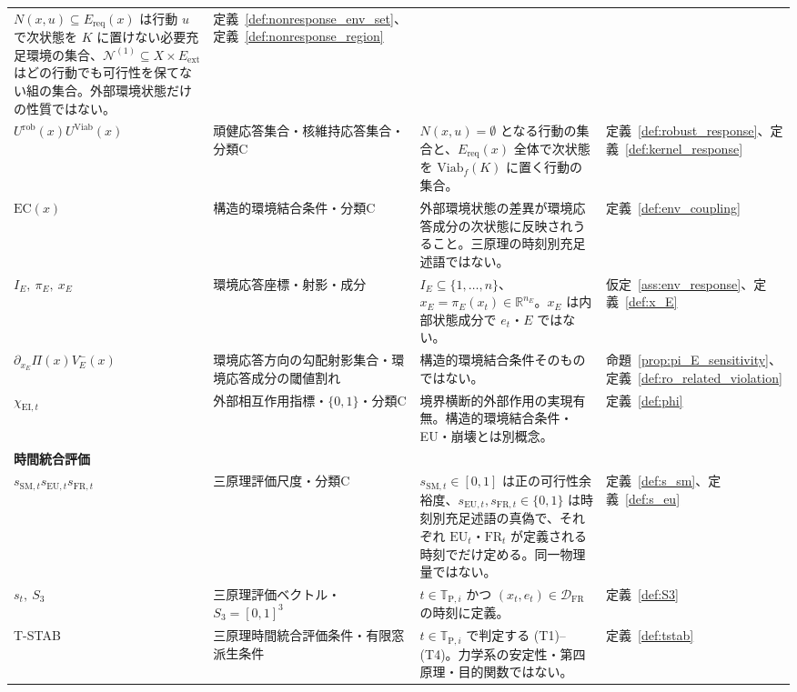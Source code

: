 \begin{longtable}{p{3.0cm} p{3.0cm} p{6.6cm} p{2.0cm}}
$N(x,u)\subseteq E_{\mathrm{req}}(x)$ は行動 $u$ で次状態を $K$ に置けない必要充足環境の集合、$\mathcal N^{(1)}\subseteq X\times E_{\mathrm{ext}}$ はどの行動でも可行性を保てない組の集合。外部環境状態だけの性質ではない。 &
定義~\ref{def:nonresponse_env_set}、定義~\ref{def:nonresponse_region} \\[3pt]
$U^{\mathrm{rob}}(x)$\newline $U^{\mathrm{Viab}}(x)$ & 頑健応答集合・核維持応答集合・分類C &
$N(x,u)=\emptyset$ となる行動の集合と、$E_{\mathrm{req}}(x)$ 全体で次状態を $\mathrm{Viab}_f(K)$ に置く行動の集合。 &
定義~\ref{def:robust_response}、定義~\ref{def:kernel_response} \\[3pt]
$\mathrm{EC}(x)$ & 構造的環境結合条件・分類C &
外部環境状態の差異が環境応答成分の次状態に反映されうること。三原理の時刻別充足述語ではない。 &
定義~\ref{def:env_coupling} \\[3pt]
$I_E,\ \pi_E,\ x_E$ & 環境応答座標・射影・成分 &
$I_E\subseteq\{1,\dots,n\}$、$x_E=\pi_E(x_t)\in\mathbb R^{n_E}$。$x_E$ は内部状態成分で $e_t$・$E$ ではない。 &
仮定~\ref{ass:env_response}、定義~\ref{def:x_E} \\[3pt]
$\partial_{x_E}\Pi(x)$\newline $V^-_E(x)$ & 環境応答方向の勾配射影集合・環境応答成分の閾値割れ &
構造的環境結合条件そのものではない。 &
命題~\ref{prop:pi_E_sensitivity}、定義~\ref{def:ro_related_violation} \\[3pt]
$\chi_{\mathrm{EI},t}$ & 外部相互作用指標・$\{0,1\}$・分類C &
境界横断的外部作用の実現有無。構造的環境結合条件・EU・崩壊とは別概念。 &
定義~\ref{def:phi} \\[3pt]
\multicolumn{4}{l}{\textbf{時間統合評価}} \\[2pt]
$s_{\mathrm{SM},t}$\newline $s_{\mathrm{EU},t}$\newline $s_{\mathrm{FR},t}$ & 三原理評価尺度・分類C &
$s_{\mathrm{SM},t}\in[0,1]$ は正の可行性余裕度、$s_{\mathrm{EU},t},s_{\mathrm{FR},t}\in\{0,1\}$ は時刻別充足述語の真偽で、それぞれ $\mathrm{EU}_t$・$\mathrm{FR}_t$ が定義される時刻でだけ定める。同一物理量ではない。 &
定義~\ref{def:s_sm}、定義~\ref{def:s_eu} \\[3pt]
$s_t,\ S_3$ & 三原理評価ベクトル・$S_3=[0,1]^3$ &
$t\in\mathbb{T}_{\mathrm{P},i}$ かつ $(x_t,e_t)\in\mathcal{D}_{\mathrm{FR}}$ の時刻に定義。 &
定義~\ref{def:S3} \\[3pt]
T-STAB & 三原理時間統合評価条件・有限窓派生条件 &
$t\in\mathbb{T}_{\mathrm{P},i}$ で判定する (T1)--(T4)。力学系の安定性・第四原理・目的関数ではない。 &
定義~\ref{def:tstab} \\[3pt]
\end{longtable}
\endgroup

